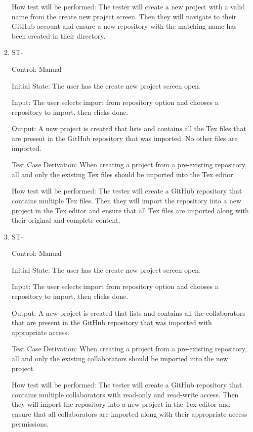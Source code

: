 \documentclass[12pt, titlepage]{article}
\newcounter{TESTID}
\newcommand\TESTNUM{\stepcounter{TESTID}\theTESTID}
\begin{document}
\begin{enumerate}
		How test will be performed: The tester will create a new project with a valid name from the create new project screen. Then they will navigate to their GitHub account and ensure a new repository with the matching name has been created in their directory.
		
		\item{ST-\TESTNUM\\}
		
		Control: Manual
		
		Initial State: The user has the create new project screen open.
		
		Input: The user selects import from repository option and chooses a repository to import, then clicks done.
		
		Output: A new project is created that lists and contains all the Tex files that are present in the GitHub repository that was imported. No other files are imported.
		
		Test Case Derivation: When creating a project from a pre-existing repository, all and only the existing Tex files should be imported into the Tex editor.
		
		How test will be performed: The tester will create a GitHub repository that contains multiple Tex files. Then they will import the repository into a new project in the Tex editor and ensure that all Tex files are imported along with their original and complete content.
		
		\item{ST-\TESTNUM\\}
		
		Control: Manual
		
		Initial State: The user has the create new project screen open.
		
		Input: The user selects import from repository option and chooses a repository to import, then clicks done.
		
		Output: A new project is created that lists and contains all the collaborators that are present in the GitHub repository that was imported with appropriate access.
		
		Test Case Derivation: When creating a project from a pre-existing repository, all and only the existing collaborators should be imported into the new project.
		
		How test will be performed: The tester will create a GitHub repository that contains multiple collaborators with read-only and read-write access. Then they will import the repository into a new project in the Tex editor and ensure that all collaborators are imported along with their appropriate access permissions.
		

\end{enumerate}
\end{document}
